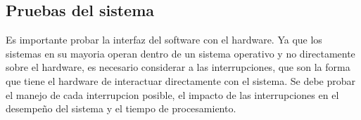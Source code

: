 \documentclass[a4paper]{article}
\begin{document}
\subsection*{Pruebas del sistema}
Es importante probar la interfaz del software con el hardware. Ya que los sistemas en su mayoria
operan dentro de un sistema operativo y no directamente sobre el hardware, es necesario considerar
a las interrupciones, que son la forma que tiene el hardware de interactuar directamente con el 
sistema. Se debe probar el manejo de cada interrupcion posible, el impacto de las interrupciones en
el desempeño del sistema y el tiempo de procesamiento.
\end{document}
